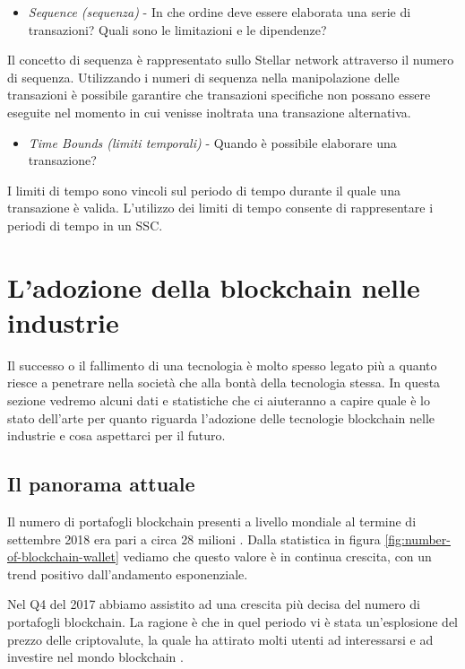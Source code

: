 \begin{itemize}
	\item \textit{Sequence (sequenza)} -
	      In che ordine deve essere elaborata una serie di transazioni?
	      Quali sono le limitazioni e le dipendenze?
\end{itemize}
Il concetto di sequenza è rappresentato sullo Stellar network attraverso
il numero di sequenza. Utilizzando i numeri di sequenza
nella manipolazione delle transazioni è possibile garantire che
transazioni specifiche non possano essere eseguite
nel momento in cui venisse inoltrata una transazione alternativa.

\begin{itemize}
	\item \textit{Time Bounds (limiti temporali)} -
	      Quando è possibile elaborare una transazione?
\end{itemize}
I limiti di tempo sono vincoli sul periodo di tempo durante il quale
una transazione è valida. L'utilizzo dei limiti di tempo
consente di rappresentare i periodi di tempo in un SSC.

\section{L'adozione della blockchain nelle industrie}
Il successo o il fallimento di una tecnologia è molto spesso legato più a quanto riesce a penetrare
nella società che alla bontà della tecnologia stessa.
In questa sezione vedremo alcuni dati e statistiche che ci aiuteranno a capire quale è
lo stato dell'arte per quanto riguarda l'adozione delle tecnologie blockchain nelle industrie
e cosa aspettarci per il futuro.

\subsection{Il panorama attuale}
Il numero di portafogli blockchain presenti a livello mondiale al termine di settembre 2018
era pari a circa 28 milioni \cite{number-of-blockchain-wallet}.
Dalla statistica in figura \ref{fig:number-of-blockchain-wallet} vediamo che questo valore è in continua crescita,
con un trend positivo dall'andamento esponenziale.

Nel Q4 del 2017 abbiamo assistito ad una crescita più decisa del numero di portafogli blockchain.
La ragione è che in quel periodo vi è stata un'esplosione del prezzo delle criptovalute, la quale
ha attirato molti utenti ad interessarsi e ad investire nel mondo blockchain \cite{bitcoin-price-boom}.

